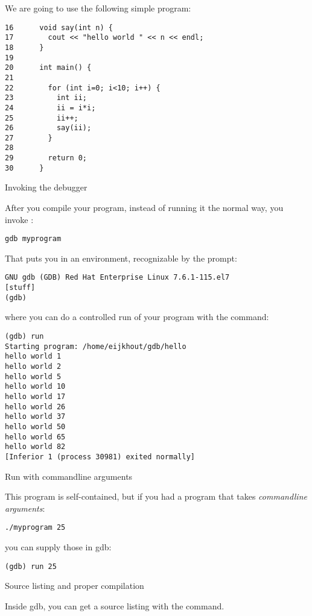 
We are going to use the following simple program:
\begin{lstlisting}
16      void say(int n) {
17        cout << "hello world " << n << endl;
18      }
19
20      int main() {
21
22        for (int i=0; i<10; i++) {
23          int ii;
24          ii = i*i;
25          ii++;
26          say(ii);
27        }
28
29        return 0;
30      }
\end{lstlisting}

 {Invoking the debugger}

After you compile your program, instead of running it the normal way,
you invoke :
\begin{verbatim}
gdb myprogram
\end{verbatim}
That puts you in an environment,
recognizable by the  prompt:
\begin{verbatim}
GNU gdb (GDB) Red Hat Enterprise Linux 7.6.1-115.el7
[stuff]
(gdb)
\end{verbatim}
where you can do a controlled run of your program with the  command:
\begin{verbatim}
(gdb) run
Starting program: /home/eijkhout/gdb/hello
hello world 1
hello world 2
hello world 5
hello world 10
hello world 17
hello world 26
hello world 37
hello world 50
hello world 65
hello world 82
[Inferior 1 (process 30981) exited normally]
\end{verbatim}

 {Run with commandline arguments}

This program is self-contained, but if you had a program that takes
\emph{commandline arguments}:
\begin{verbatim}
./myprogram 25
\end{verbatim}
you can supply those in gdb:
\begin{verbatim}
(gdb) run 25
\end{verbatim}

 {Source listing and proper compilation}

Inside gdb, you can get a source listing with the  command.

